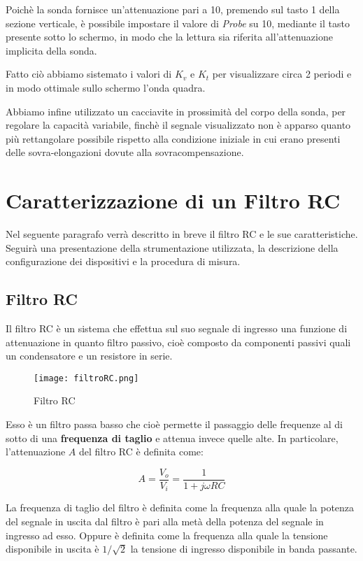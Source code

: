 Poichè la sonda fornisce un'attenuazione pari a 10, premendo sul tasto 1 della sezione verticale, è possibile impostare il valore di \emph{Probe} su 10, mediante il tasto presente sotto lo schermo, in modo che la lettura sia riferita all'attenuazione implicita della sonda.

Fatto ciò abbiamo sistemato i valori di $K_v$ e $K_t$ per visualizzare circa 2 periodi e in modo ottimale sullo schermo l'onda quadra.

Abbiamo infine utilizzato un cacciavite in prossimità del corpo della sonda, per regolare la capacità variabile, finchè il segnale visualizzato non è apparso quanto più rettangolare possibile rispetto alla condizione iniziale in cui erano presenti delle sovra-elongazioni dovute alla sovracompensazione.


\clearpage
\section{Caratterizzazione di un Filtro RC} \label{sec:filtroRC}
Nel seguente paragrafo verrà descritto in breve il filtro RC e le sue caratteristiche. Seguirà una presentazione della strumentazione utilizzata, la descrizione della configurazione dei dispositivi e la procedura di misura.

\subsection{Filtro RC}
Il filtro RC è un sistema che effettua sul suo segnale di ingresso una funzione di attenuazione in quanto filtro passivo, cioè composto da componenti passivi quali un condensatore e un resistore in serie.

\begin{figure}[h]
    \centering
    \texttt{[image: filtroRC.png]}
    \caption{Filtro RC}
    \label{fig:filtroRC}
\end{figure}
\FloatBarrier

Esso è un filtro passa basso che cioè permette il passaggio delle frequenze al di sotto di una \textbf{frequenza di taglio} e attenua invece quelle alte. In particolare, l'attenuazione $A$ del filtro RC è definita come:

\[A=\frac{V_o}{V_i}=\frac{1}{1+j\omega RC}\]

La frequenza di taglio del filtro è definita come la frequenza alla quale la potenza del segnale in uscita dal filtro è pari alla metà della potenza del segnale in ingresso ad esso. Oppure è definita come la frequenza alla quale la tensione disponibile in uscita è $1/\sqrt{2}$ la tensione di ingresso disponibile in banda passante.

